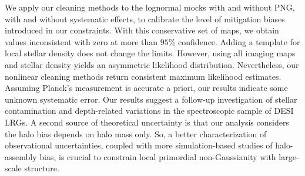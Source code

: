 We apply our cleaning methods to the lognormal mocks with and without PNG, with and without systematic effects, to calibrate the level of mitigation biases introduced in our constraints. With this conservative set of maps, we obtain values inconsistent with zero at more than $95\%$ confidence. Adding a template for local stellar density does not change the limits. However, using all imaging maps and stellar density yields an asymmetric likelihood distribution. Nevertheless, our nonlinear cleaning methods return consistent maximum likelihood estimates. Assuming Planck's measurement is accurate a priori, our results indicate some unknown systematic error. Our results suggest a follow-up investigation of stellar contamination and depth-related variations in the spectroscopic sample of DESI LRGs. A second source of theoretical uncertainty is that our analysis considers the halo bias depends on halo mass only. So, a better characterization of observational uncertainties, coupled with more simulation-based studies of halo-assembly bias, is crucial to constrain local primordial non-Gaussianity with large-scale structure.